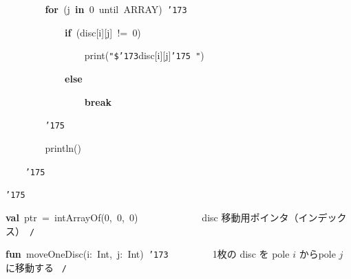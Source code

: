 \documentclass[a4paper,10pt]{article}
\def\mc{\relax}
\begin{document}
\noindent
\mbox{}{\tt\mc \ }{\tt\mc \ }{\tt\mc \ }{\tt\mc \ }{\tt\mc \ }{\tt\mc \ }{\tt\mc \ }{\tt\mc \ }\textbf{for}{\tt\mc \ }(j{\tt\mc \ }\textbf{in}{\tt\mc \ }0{\tt\mc \ }until{\tt\mc \ }ARRAY){\tt\mc \ }{\tt\char'173}

\noindent
\mbox{}{\tt\mc \ }{\tt\mc \ }{\tt\mc \ }{\tt\mc \ }{\tt\mc \ }{\tt\mc \ }{\tt\mc \ }{\tt\mc \ }{\tt\mc \ }{\tt\mc \ }{\tt\mc \ }{\tt\mc \ }\textbf{if}{\tt\mc \ }(disc[i][j]{\tt\mc \ }!={\tt\mc \ }0)

\noindent
\mbox{}{\tt\mc \ }{\tt\mc \ }{\tt\mc \ }{\tt\mc \ }{\tt\mc \ }{\tt\mc \ }{\tt\mc \ }{\tt\mc \ }{\tt\mc \ }{\tt\mc \ }{\tt\mc \ }{\tt\mc \ }{\tt\mc \ }{\tt\mc \ }{\tt\mc \ }{\tt\mc \ }print({\tt "}{\tt\$}{\tt\char'173}disc[i][j]{\tt\char'175}{\tt\mc \ }{\tt "})

\noindent
\mbox{}{\tt\mc \ }{\tt\mc \ }{\tt\mc \ }{\tt\mc \ }{\tt\mc \ }{\tt\mc \ }{\tt\mc \ }{\tt\mc \ }{\tt\mc \ }{\tt\mc \ }{\tt\mc \ }{\tt\mc \ }\textbf{else}

\noindent
\mbox{}{\tt\mc \ }{\tt\mc \ }{\tt\mc \ }{\tt\mc \ }{\tt\mc \ }{\tt\mc \ }{\tt\mc \ }{\tt\mc \ }{\tt\mc \ }{\tt\mc \ }{\tt\mc \ }{\tt\mc \ }{\tt\mc \ }{\tt\mc \ }{\tt\mc \ }{\tt\mc \ }\textbf{break}

\noindent
\mbox{}{\tt\mc \ }{\tt\mc \ }{\tt\mc \ }{\tt\mc \ }{\tt\mc \ }{\tt\mc \ }{\tt\mc \ }{\tt\mc \ }{\tt\char'175}

\noindent
\mbox{}{\tt\mc \ }{\tt\mc \ }{\tt\mc \ }{\tt\mc \ }{\tt\mc \ }{\tt\mc \ }{\tt\mc \ }{\tt\mc \ }println()

\noindent
\mbox{}{\tt\mc \ }{\tt\mc \ }{\tt\mc \ }{\tt\mc \ }{\tt\char'175}

\noindent
\mbox{}{\tt\char'175}

\noindent
\mbox{}\hfill

\noindent
\mbox{}\textbf{val}{\tt\mc \ }ptr{\tt\mc \ }={\tt\mc \ }intArrayOf(0,{\tt\mc \ }0,{\tt\mc \ }0){\tt\mc \ }{\tt\mc \ }{\tt\mc \ }{\tt\mc \ }{\tt\mc \ }{\tt\mc \ }{\tt\mc \ }{\tt\mc \ }{\tt\mc \ }{\tt\mc \ }{\tt\mc \ }\rm\mc {\tt /}{\tt *}\  \ disc 移動用ポインタ（インデックス）\hfill \rm\mc \ {\tt *}{\tt /}
\tt\mc 

\noindent
\mbox{}\hfill

\noindent
\mbox{}\textbf{fun}{\tt\mc \ }moveOneDisc(i:{\tt\mc \ }Int,{\tt\mc \ }j:{\tt\mc \ }Int){\tt\mc \ }{\tt\char'173}{\tt\mc \ }{\tt\mc \ }{\tt\mc \ }{\tt\mc \ }{\tt\mc \ }{\tt\mc \ }{\tt\mc \ }\rm\mc {\tt /}{\tt *}\  \ 1枚の disc を pole $i$ からpole $j$ に移動する \hfill \rm\mc \ {\tt *}{\tt /}
\tt\mc 
\end{document}
